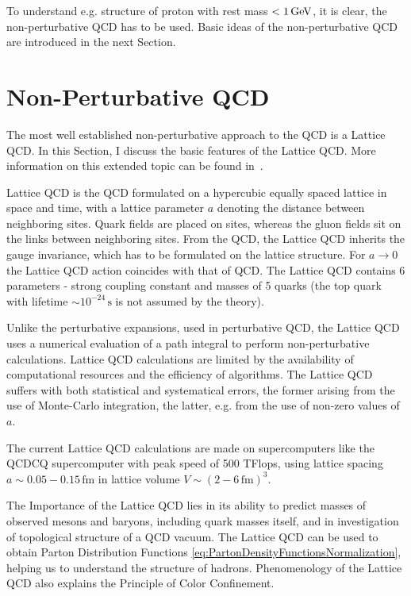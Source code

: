 To understand e.g. structure of proton with rest mass $< 1\,\text{GeV}$, it is clear, the 
non-perturbative QCD has to be used. Basic ideas of the non-perturbative QCD are
introduced in the next Section. 

\section{Non-Perturbative QCD}

The most well established non-perturbative approach to the QCD is a Lattice QCD.
In this Section, I discuss the basic features of the Lattice QCD. More
information on this extended topic can be found in~\cite{QCDTextbook,LQCDIntro}.

Lattice QCD is the QCD formulated on a hypercubic equally spaced lattice in
space and time, with a lattice parameter $a$ denoting the distance between
neighboring sites.
Quark fields are placed on sites, whereas the gluon fields sit on the links
between neighboring sites. From the QCD, the Lattice QCD inherits the gauge
invariance, which has to be formulated on the lattice structure.
For $a \rightarrow 0$ the Lattice QCD action coincides with that of QCD. 
The Lattice QCD contains 6 parameters - strong coupling constant and masses of 5
quarks (the top quark with lifetime $ \sim 10^{-24}\,\text{s}$ is not assumed by
the theory).

Unlike the perturbative expansions, used in perturbative QCD, the Lattice QCD
uses a numerical evaluation of a path integral to perform non-perturbative
calculations. 
Lattice QCD calculations are limited by the availability of computational
resources and the efficiency of algorithms. The Lattice QCD suffers with both
statistical and systematical errors, the former arising from the use of
Monte-Carlo integration, the latter, e.g. from the use of non-zero values of
$a$.

The current Lattice QCD calculations are made on supercomputers like the QCDCQ
supercomputer \cite{SuperComputer} with peak speed of 500 TFlops, using lattice
spacing $a \sim 0.05 - 0.15 \, \text{fm}$ in lattice volume $V \sim (2 - 6
\,\text{fm} )^3$.

The Importance of the Lattice QCD lies in its ability to predict masses of observed
mesons and baryons, including quark masses itself, and in investigation of
topological structure of a QCD vacuum.  The Lattice QCD can be used to obtain
Parton Distribution Functions
\eqref{eq:PartonDensityFunctionsNormalization}, helping us to understand the
structure of hadrons. Phenomenology of the Lattice QCD also explains the Principle of Color
Confinement. 


